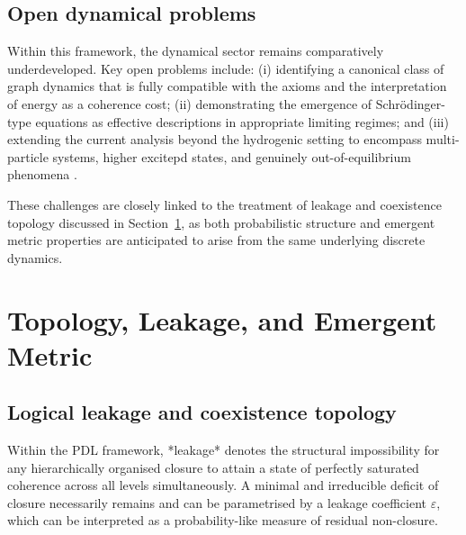 \documentclass[11pt,a4paper]{article}
\begin{document}
\subsection{Open dynamical problems}
\label{subsec:dynamical_open}

Within this framework, the dynamical sector remains comparatively underdeveloped. Key open problems include: (i) identifying a canonical class of graph dynamics that is fully compatible with the axioms and the interpretation of energy as a coherence cost; (ii) demonstrating the emergence of Schrödinger-type equations as effective descriptions in appropriate limiting regimes; and (iii) extending the current analysis beyond the hydrogenic setting to encompass multi-particle systems, higher excitepd states, and genuinely out-of-equilibrium phenomena
\citep{Coherence_Leakage_18_2026,PDL_position}.

These challenges are closely linked to the treatment of leakage and coexistence topology discussed in Section~\ref{sec:topology_metric}, as both probabilistic structure and emergent metric properties are anticipated to arise from the same underlying discrete dynamics.

\section{Topology, Leakage, and Emergent Metric}
\label{sec:topology_metric}

\subsection{Logical leakage and coexistence topology}
\label{subsec:leakage_coexistence}

Within the PDL framework, *leakage* denotes the structural impossibility for any hierarchically organised closure to attain a state of perfectly saturated coherence across all levels simultaneously. A minimal and irreducible deficit of closure necessarily remains and can be parametrised by a leakage coefficient $\varepsilon$, which can be interpreted as a probability-like measure of residual non-closure.\cite{Topological_Reformulation_PDL_2026} 
\end{document}
